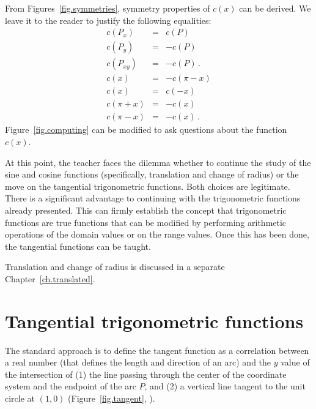 From Figures~\ref{fig.symmetries}, symmetry properties of $c(x)$ can be derived. We leave it to the reader to justify the following equalities:
\begin{eqnarray*}
c(P_x) &=& c(P)\\
c(P_y) &=& -c(P)\\
c(P_{xy}) &=& -c(P)\,.
\\
c(x) &=& -c(\pi - x)\\
c(x) &=& c(-x)\\
c(\pi+x) &=& -c(x)\\
c(\pi-x) &=& -c(x)\,.
\end{eqnarray*}
Figure~\ref{fig.computing} can be modified to ask questions about the function $c(x)$.

At this point, the teacher faces the dilemma whether to continue the study of the sine and cosine functions (specifically, translation and change of radius) or the move on the tangential trigonometric functions.
Both choices are legitimate.
There is a significant advantage to continuing with the trigonometric functions already presented. 
This can firmly establish the concept that trigonometric functions are true functions that can be modified by performing arithmetic operations of the domain values or on the range values.
Once this has been done, the tangential functions can be taught.

Translation and change of radius is discussed in a separate Chapter~\ref{ch.translated}.



\section{Tangential trigonometric functions}

The standard approach is to define the tangent function as a correlation between a real number (that defines the length and direction of an arc) and the $y$ value of the intersection of (1) the line passing through the center of the coordinate system and the endpoint of the arc $P$, and (2) a vertical line tangent to the unit circle at $(1,0)$ (Figure~\ref{fig.tangent}, ).

